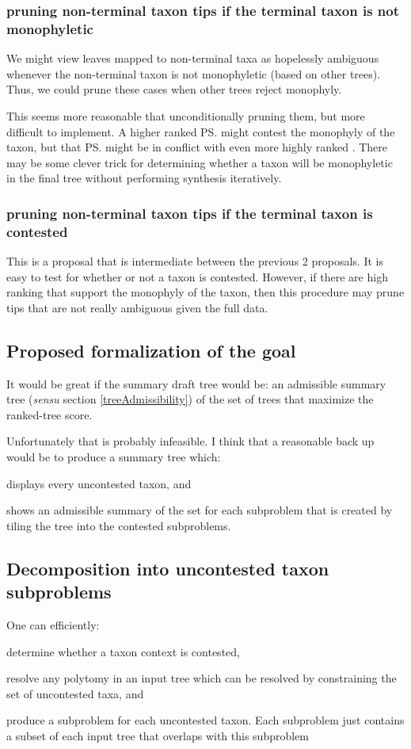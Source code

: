 \documentclass[11pt]{article}
\begin{document}
\subsubsection{pruning non-terminal taxon tips if the terminal taxon is not monophyletic}
We might view leaves mapped to non-terminal taxa as hopelessly ambiguous whenever the non-terminal
    taxon is not monophyletic (based on other trees).
Thus, we could prune these cases when other trees reject monophyly.

This seems more reasonable that unconditionally pruning them, but more difficult to implement.
A higher ranked \ps might contest the monophyly of the taxon, but that \ps might be 
    in conflict with even more highly ranked \pss.
There may be some clever trick for determining whether a taxon will be monophyletic in the
    final tree without performing synthesis iteratively.

\subsubsection{pruning non-terminal taxon tips if the terminal taxon is contested}
This is a proposal that is intermediate between the previous 2 proposals.
It is easy to test for whether or not a taxon is contested.
However, if there are high ranking \pss that support the monophyly of the taxon,
    then this procedure may prune tips that are not really ambiguous given 
    the full data.

\subsection{Proposed formalization of the goal}
It would be great if the summary draft tree would be:
    an admissible summary tree ({\em sensu} section \ref{treeAdmissibility}) of the set of trees
    that maximize the ranked-tree \SWIPSD score.

Unfortunately that is probably infeasible.  I think that a reasonable back up would be to 
    produce a summary tree which:
\begin{compactenum}
    \item displays every uncontested taxon, and
    \item shows an admissible summary of the \MSWIPSD set for each subproblem that is
       created by tiling the tree into the contested subproblems.
\end{compactenum}
\subsection{Decomposition into uncontested taxon subproblems}
One can efficiently:
\begin{compactenum}
    \item determine whether a taxon context is contested,
    \item resolve any polytomy in an input tree which can be resolved by constraining
        the set of uncontested taxa, and
    \item produce a subproblem for each uncontested taxon. Each subproblem just contains
        a subset of each input tree that overlaps with this subproblem
\end{compactenum}
\end{document}
